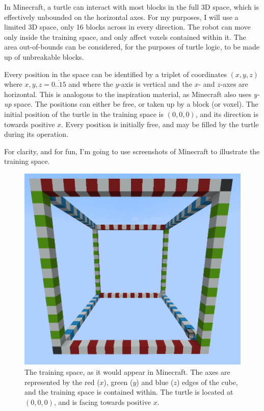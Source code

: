 \documentclass{report}
\begin{document}
In Minecraft, a turtle can interact with most blocks in the full 3D space, which is effectively unbounded on the horizontal axes. For my purposes, I will use a limited 3D space, only 16 blocks across in every direction. The robot can move only inside the training space, and only affect voxels contained within it. The area out-of-bounds can be considered, for the purposes of turtle logic, to be made up of unbreakable blocks.

Every position in the space can be identified by a triplet of coordinates $(x, y, z)$ where $x, y, z = \overline{0..15}$ and where the $y$-axis is vertical and the $x$- and $z$-axes are horizontal. This is analogous to the inspiration material, as Minecraft also uses \emph{y-up} space. The positions can either be free, or taken up by a block (or voxel). The initial position of the turtle in the training space is $(0, 0, 0)$, and its direction is towards positive $x$. Every position is initially free, and may be filled by the turtle during its operation.

For clarity, and for fun, I'm going to use screenshots of Minecraft to illustrate the training space.

\begin{figure}[ht]
    \centering
    \includegraphics[scale=0.4]{minecraft1}
    \caption{The training space, as it would appear in Minecraft. The axes are represented by the red ($x$), green ($y$) and blue ($z$) edges of the cube, and the training space is contained within. The turtle is located at $(0, 0, 0)$, and is facing towards positive $x$.}
\end{figure}
\end{document}

